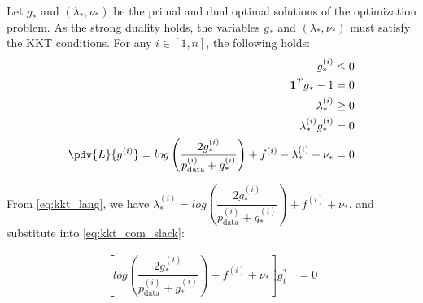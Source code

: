 

Let $g_*$ and $(\lambda_*, \nu_*)$ be the primal and dual optimal solutions of the optimization problem. As the strong duality holds, the variables $g_*$ and $(\lambda_*, \nu_*)$ must satisfy the KKT conditions. For any $i \in [1, n]$, the following holds:
\begin{align}
    -g_*^{(i)} & \leq 0 \\ 
    \mathbf{1}^T g_* - 1 & = 0 \\ 
    \lambda_*^{(i)} & \geq 0 \\ 
    \lambda_*^{(i)} g_*^{(i)} & = 0 \label{eq:kkt_com_slack} \\ 
    \pdv{L}{ g^{(i)} } = log \left( \dfrac{ 2g_*^{(i)} } { p_{\text{data} }^{(i)} + g_*^{(i)} } \right) + f^{ (i) } - \lambda_*^{(i)} + \nu_* & = 0 \label{eq:kkt_lang}
\end{align}

From \autoref{eq:kkt_lang}, we have $ \lambda_*^{(i)} = log \left( \dfrac{ 2g_*^{(i)} } { p_{\text{data} }^{(i)} + g_*^{(i)} } \right) + f^{ (i) } + \nu_* $, and substitute into \autoref{eq:kkt_com_slack}:

\begin{align}
    \left[ log \left( \dfrac{ 2g_*^{(i)} } { p_{\text{data} }^{(i)} + g_*^{(i)} } \right) + f^{ (i) } + \nu_* \right] g^*_i & = 0
\end{align}

